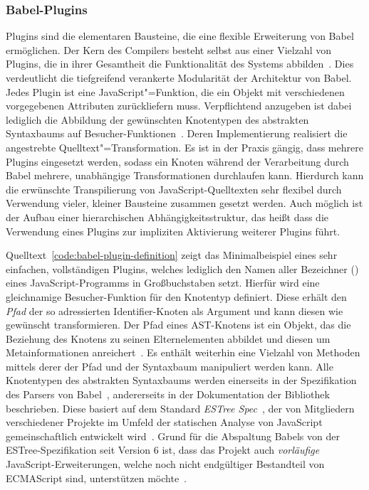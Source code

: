 \subsubsection{Babel-Plugins}
\label{subsection:babel-plugins}

Plugins sind die elementaren Bausteine, die eine flexible Erweiterung von Babel ermöglichen. Der Kern des Compilers besteht selbst aus einer Vielzahl von Plugins, die in ihrer Gesamtheit die Funktionalität des Systems abbilden~\autocite{BABEL}. Dies verdeutlicht die tiefgreifend verankerte Modularität der Architektur von Babel. Jedes Plugin ist eine JavaScript"=Funktion, die ein Objekt mit verschiedenen vorgegebenen Attributen zurückliefern muss. Verpflichtend anzugeben ist dabei lediglich die Abbildung der gewünschten Knotentypen des abstrakten Syntaxbaums auf Besucher-Funktionen~\autocite{BABEL:HANDBOOK}. Deren Implementierung realisiert die angestrebte Quelltext"=Transformation. Es ist in der Praxis gängig, dass mehrere Plugins eingesetzt werden, sodass ein Knoten während der Verarbeitung durch Babel mehrere, unabhängige Transformationen durchlaufen kann. Hierdurch kann die erwünschte Transpilierung von JavaScript-Quelltexten sehr flexibel durch Verwendung vieler, kleiner Bausteine zusammen gesetzt werden. Auch möglich ist der Aufbau einer hierarchischen Abhängigkeitsstruktur, das heißt dass die Verwendung eines Plugins zur impliziten Aktivierung weiterer Plugins führt.

Quelltext~\ref{code:babel-plugin-definition} zeigt das Minimalbeispiel eines sehr einfachen, vollständigen Plugins, welches lediglich den Namen aller Bezeichner () eines JavaScript-Programms in Großbuchstaben setzt. Hierfür wird eine gleichnamige Besucher-Funktion für den Knotentyp  definiert. Diese erhält den \emph{Pfad} der so adressierten Identifier-Knoten als Argument und kann diesen wie gewünscht transformieren. Der Pfad eines AST-Knotens ist ein Objekt, das die Beziehung des Knotens zu seinen Elternelementen abbildet und diesen um Metainformationen anreichert~\autocite{BABEL:HANDBOOK}. Es enthält weiterhin eine Vielzahl von Methoden mittels derer der Pfad und der Syntaxbaum manipuliert werden kann.
Alle Knotentypen des abstrakten Syntaxbaums werden einerseits in der Spezifikation des Parsers von Babel~\autocite{BABEL:PARSER_SPEC,BABEL:PARSER}, andererseits in der Dokumentation der Bibliothek \autocite{BABEL:TYPES} beschrieben. Diese basiert auf dem Standard \textit{ESTree Spec}~\autocite{ESTREE_SPEC}, der von Mitgliedern verschiedener Projekte im Umfeld der statischen Analyse von JavaScript gemeinschaftlich entwickelt wird~\autocite{BABEL:PARSER,ESTREE_SPEC}. Grund für die Abspaltung Babels von der ESTree-Spezifikation seit Version 6 ist, dass das Projekt auch \emph{vorläufige} JavaScript-Erweiterungen, welche noch nicht endgültiger Bestandteil von ECMAScript sind, unterstützen möchte~\autocite{BABEL:STATE_OF_BABEL}.


